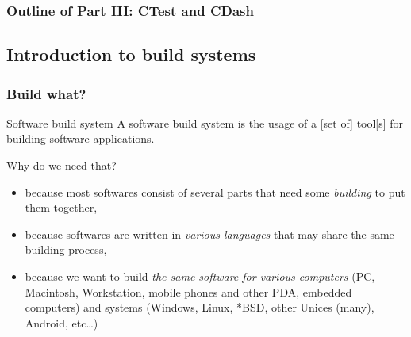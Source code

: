 \documentclass[compress,slidestop,table,usepdftitle=false
              ]
               {beamer}
\begin{document}
\begin{frame}
\frametitle{Outline of Part III: CTest and CDash}
\tableofcontents[part=3]
\end{frame}

\subsection*{Introduction to build systems}
\begin{frame}
\frametitle{Build what?}
\begin{block}{Software build system}
A software build system is the usage of a [set of] tool[s] for building software applications.
\end{block}
\begin{block}{Why do we need that?}
\begin{itemize}
\pause
\item because most softwares consist of several parts that need
      some \emph{building} to put them together,
\pause
\item because softwares are written in \emph{various languages} 
      that may share the same building process,
\pause
\item because we want to build \emph{the same software for various computers} {\scriptsize (PC, Macintosh, Workstation, mobile phones and other PDA, embedded computers) and systems (Windows, Linux, *BSD, other Unices (many), Android, etc\ldots)}
\end{itemize}
\end{block}
\end{frame}
\end{document}
